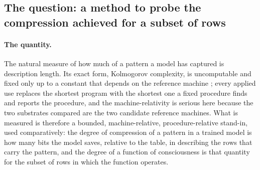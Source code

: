 \subsection{The question: a method to probe the compression achieved for a subset of rows}
\label{sec:quantity}
\label{sec:measure}
\label{sec:memorization}
\label{sec:twomeasurements}
\label{sec:method}

\paragraph{The quantity.}
The natural measure of how much of a pattern a model has captured is description length. Its exact
form, Kolmogorov complexity, is uncomputable and fixed only up to a constant that depends on the
reference machine \citep{livitanyi2019}; every applied use replaces the shortest program with the
shortest one a fixed procedure finds and reports the procedure, and the machine-relativity is serious
here because the two substrates compared are the two candidate reference machines. What is measured
is therefore a bounded, machine-relative, procedure-relative stand-in, used comparatively: the degree
of compression of a pattern in a trained model is how many bits the model saves, relative to the
table, in describing the rows that carry the pattern, and the degree of a function of consciousness
is that quantity for the subset of rows in which the function operates.

